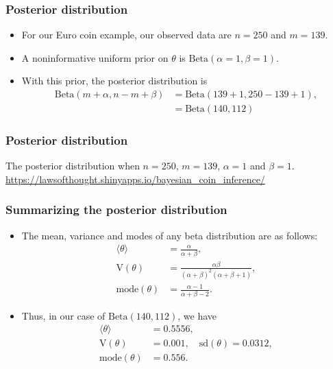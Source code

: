 \documentclass{slides}
\begin{document}
\begin{frame}
	\frametitle{Posterior distribution}
	\begin{itemize}
		\item For our Euro coin example, our observed data are $n=250$ and $m=139$.
		\item A noninformative uniform prior on $\theta$ is $\textrm{Beta}(\alpha=1,\beta=1)$.
		\item With this prior, the posterior distribution is 
			\begin{align*}
				\textrm{Beta}(m + \alpha, n - m + \beta) &= \textrm{Beta}(139 + 1, 250 - 139 + 1),\\
				&= \textrm{Beta}(140, 112)
			\end{align*}
	\end{itemize}
\end{frame}
\begin{frame}
	\frametitle{Posterior distribution}
	
	The posterior distribution when $n=250$, $m=139$, $\alpha=1$ and $\beta=1$.\\
	{\small	\url{https://lawsofthought.shinyapps.io/bayesian_coin_inference/}}
\end{frame}

\begin{frame}
	\frametitle{Summarizing the posterior distribution}
	\begin{itemize}
		\item The mean, variance and modes of any beta distribution are as follows:
			\begin{align*}
				\langle \theta \rangle &=\frac{\alpha}{\alpha+\beta} ,\\
				\mathrm{V}(\theta) &= \frac{\alpha\beta}{(\alpha+\beta)^2(\alpha+\beta+1)},\\
				\textrm{mode}(\theta) &= \frac{\alpha-1}{\alpha+\beta-2}.
			\end{align*}
		\item Thus, in our case of $\textrm{Beta}(140, 112)$, we have
			\begin{align*}
				\langle \theta \rangle &=  0.5556,\\
				\mathrm{V}(\theta) &= 0.001, \quad\textrm{sd}(\theta) = 0.0312,\\
				\textrm{mode}(\theta) &= 0.556.
			\end{align*}

	\end{itemize}
\end{frame}
\end{document}
